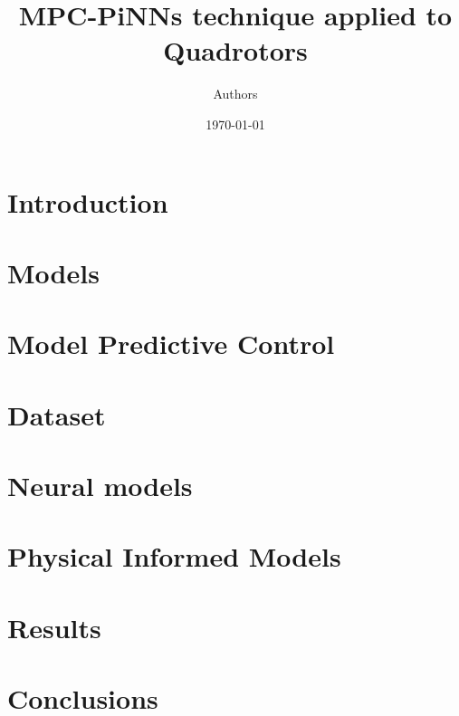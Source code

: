 \documentclass[12pt]{article}
\title{MPC-PiNNs technique applied to Quadrotors}
\author{Authors}
\date{\today} %
\begin{document}
\setlength{\parindent}{0pt}

\maketitle
\todototoc
\listoftodos
\tableofcontents
\clearpage
\section{Introduction} 
\section{Models} 
\section{Model Predictive Control} 
\section{Dataset} 
\section{Neural models} 
\section{Physical Informed Models} 
\section{Results} 

\section{Conclusions} 

  

\end{document}
